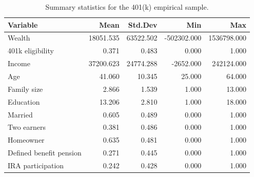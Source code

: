 \begin{table}[!htbp]
\centering
\caption{Summary statistics for the 401(k) empirical sample.}
\label{tab:summary-statistics-empirical}
\begin{tabular}{lrrrr}
 \hline
Variable & Mean & Std.Dev & Min & Max \\
 \hline
Wealth & 18051.535 & 63522.502 & -502302.000 & 1536798.000 \\
401k eligibility & 0.371 & 0.483 & 0.000 & 1.000 \\
Income & 37200.623 & 24774.288 & -2652.000 & 242124.000 \\
Age & 41.060 & 10.345 & 25.000 & 64.000 \\
Family size & 2.866 & 1.539 & 1.000 & 13.000 \\
Education & 13.206 & 2.810 & 1.000 & 18.000 \\
Married & 0.605 & 0.489 & 0.000 & 1.000 \\
Two earners & 0.381 & 0.486 & 0.000 & 1.000 \\
Homeowner & 0.635 & 0.481 & 0.000 & 1.000 \\
Defined benefit pension & 0.271 & 0.445 & 0.000 & 1.000 \\
IRA participation & 0.242 & 0.428 & 0.000 & 1.000 \\
 \hline
\end{tabular}
\end{table}


